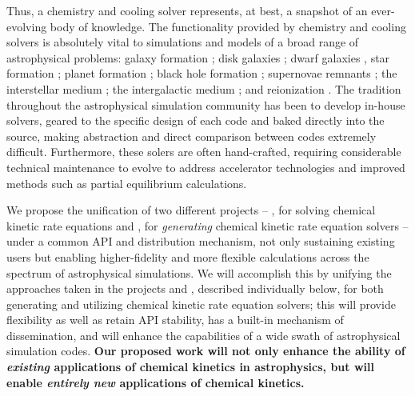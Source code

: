 Thus, a chemistry and cooling solver
represents, at best, a snapshot of an ever-evolving body of
knowledge.  The functionality provided by chemistry and cooling solvers is
absolutely vital to simulations and models of a broad range of
astrophysical problems: galaxy formation \citep{2016ApJ...830L..13M,
2016MNRAS.462.3265D, 2017MNRAS.465.2540P, 2017MNRAS.466..105A,
2017MNRAS.tmp..110D}; disk galaxies \citep{2015MNRAS.449.2588P,
2015ApJ...814..131G}; dwarf galaxies \citep{2017arXiv170108779H}, 
star formation \citep{2013RvMP...85.1021T, 2016Natur.535..523F,
2017ApJ...835..137W};
planet formation \citep{2013RvMP...85.1021T, 2017A&A...605A..16F,
2018arXiv180310526A};
black hole formation \citep{2016MNRAS.459.3217L, 2016MNRAS.459.4209A,
2016MNRAS.459.3377R, 2016MNRAS.461..111R}; supernovae remnants
\citep{2012ApJ...748...12S, 2016arXiv161008528B, 2017MNRAS.465.2471G};
the interstellar medium \citep{2015ApJ...814....4L,
2016arXiv161201786K}; the intergalactic medium
\citep{2011ApJ...731....6S, 2011MNRAS.413..190T, 2012MNRAS.420..829O};
and reionization \citep{2014ApJ...789L..32K, 2015ApJ...811....3S}.
The tradition throughout the astrophysical simulation community has
been to develop in-house solvers, geared to the specific design of
each code and baked directly into the source, making abstraction and
direct comparison between codes extremely difficult.  Furthermore, these solers
are often hand-crafted, requiring considerable technical maintenance to evolve
to address accelerator technologies and improved methods such as partial
equilibrium calculations.

We propose the unification of two different projects -- \grackle{}, for solving
chemical kinetic rate equations and \dengo{}, for \textit{generating} chemical
kinetic rate equation solvers -- under a common API and distribution mechanism,
not only sustaining existing users but enabling higher-fidelity and more
flexible calculations across the spectrum of astrophysical simulations.  We
will accomplish this by unifying the approaches taken in the projects
\grackle{} and \dengo{}, described individually below, for both generating and
utilizing chemical kinetic rate equation solvers; this will provide flexibility
as well as retain API stability, has a built-in mechanism of dissemination, and
will enhance the capabilities of a wide swath of astrophysical simulation
codes.  \textbf{Our proposed work will not only enhance the ability of
\textit{existing} applications of chemical kinetics in astrophysics, but will
enable \textit{entirely new} applications of chemical kinetics.}  
